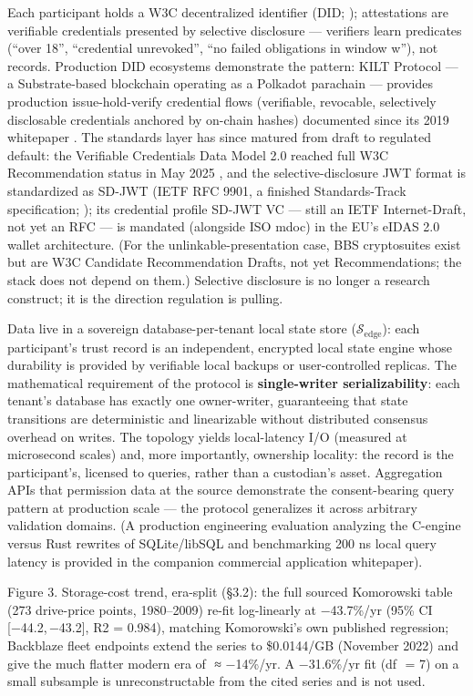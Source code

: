 \documentclass[
]{article}
\begin{document}
Each participant holds a W3C decentralized identifier (DID; );
attestations are verifiable credentials presented by selective
disclosure --- verifiers learn predicates (``over 18'', ``credential
unrevoked'', ``no failed obligations in window w''), not records.
Production DID ecosystems demonstrate the pattern: KILT Protocol --- a
Substrate-based blockchain operating as a Polkadot parachain ---
provides production issue-hold-verify credential flows (verifiable,
revocable, selectively disclosable credentials anchored by on-chain
hashes) documented since its 2019 whitepaper . The standards layer has
since matured from draft to regulated default: the Verifiable
Credentials Data Model 2.0 reached full W3C Recommendation status in May
2025 , and the selective-disclosure JWT format is standardized as SD-JWT
(IETF RFC 9901, a finished Standards-Track specification; ); its
credential profile SD-JWT VC --- still an IETF Internet-Draft, not yet
an RFC --- is mandated (alongside ISO mdoc) in the EU's eIDAS 2.0 wallet
architecture. (For the unlinkable-presentation case, BBS cryptosuites
exist but are W3C Candidate Recommendation Drafts, not yet
Recommendations; the stack does not depend on them.) Selective
disclosure is no longer a research construct; it is the direction
regulation is pulling.

Data live in a sovereign database-per-tenant local state store
(\(\mathcal{S}_{\text{edge}}\)): each participant's trust record is an
independent, encrypted local state engine whose durability is provided
by verifiable local backups or user-controlled replicas. The
mathematical requirement of the protocol is \textbf{single-writer
serializability}: each tenant's database has exactly one owner-writer,
guaranteeing that state transitions are deterministic and linearizable
without distributed consensus overhead on writes. The topology yields
local-latency I/O (measured at microsecond scales) and, more
importantly, ownership locality: the record is the participant's,
licensed to queries, rather than a custodian's asset. Aggregation APIs
that permission data at the source demonstrate the consent-bearing query
pattern at production scale --- the protocol generalizes it across
arbitrary validation domains. (A production engineering evaluation
analyzing the C-engine versus Rust rewrites of SQLite/libSQL and
benchmarking 200 ns local query latency is provided in the companion
commercial application whitepaper).

Figure 3. Storage-cost trend, era-split (§3.2): the full sourced
Komorowski table {} (273 drive-price points, 1980--2009) re-fit
log-linearly at {−43.7}\%/yr (95\% CI {{[}−44.2, −43.2{]}},
{R2 = 0.984}), matching Komorowski's own published regression; Backblaze
fleet endpoints {} extend the series to \$0.0144/GB (November 2022) and
give the much flatter modern era of { ≈ −14}\%/yr. A {−31.6}\%/yr fit
(df { = 7}) on a small subsample is unreconstructable from the cited
series and is not used.
\end{document}
